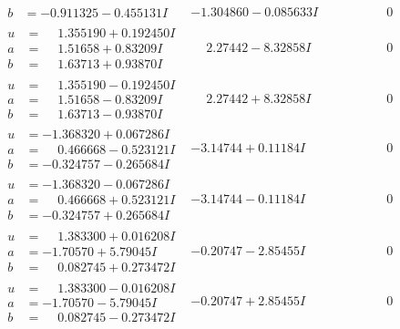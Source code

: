 \documentclass[1p]{elsarticle_modified}
\theoremstyle{definition}
\begin{document}
$$\begin{array}{c|c|c}
\begin{aligned}
b &= -0.911325 - 0.455131 I\end{aligned}
 & -1.304860 - 0.085633 I & \phantom{-0.000000 } 0 \\ \hline\begin{aligned}
u &= \phantom{-}1.355190 + 0.192450 I \\
a &= \phantom{-}1.51658 + 0.83209 I \\
b &= \phantom{-}1.63713 + 0.93870 I\end{aligned}
 & \phantom{-}2.27442 - 8.32858 I & \phantom{-0.000000 } 0 \\ \hline\begin{aligned}
u &= \phantom{-}1.355190 - 0.192450 I \\
a &= \phantom{-}1.51658 - 0.83209 I \\
b &= \phantom{-}1.63713 - 0.93870 I\end{aligned}
 & \phantom{-}2.27442 + 8.32858 I & \phantom{-0.000000 } 0 \\ \hline\begin{aligned}
u &= -1.368320 + 0.067286 I \\
a &= \phantom{-}0.466668 - 0.523121 I \\
b &= -0.324757 - 0.265684 I\end{aligned}
 & -3.14744 + 0.11184 I & \phantom{-0.000000 } 0 \\ \hline\begin{aligned}
u &= -1.368320 - 0.067286 I \\
a &= \phantom{-}0.466668 + 0.523121 I \\
b &= -0.324757 + 0.265684 I\end{aligned}
 & -3.14744 - 0.11184 I & \phantom{-0.000000 } 0 \\ \hline\begin{aligned}
u &= \phantom{-}1.383300 + 0.016208 I \\
a &= -1.70570 + 5.79045 I \\
b &= \phantom{-}0.082745 + 0.273472 I\end{aligned}
 & -0.20747 - 2.85455 I & \phantom{-0.000000 } 0 \\ \hline\begin{aligned}
u &= \phantom{-}1.383300 - 0.016208 I \\
a &= -1.70570 - 5.79045 I \\
b &= \phantom{-}0.082745 - 0.273472 I\end{aligned}
 & -0.20747 + 2.85455 I & \phantom{-0.000000 } 0 \\ \hline\begin{aligned}

\end{aligned}
\end{array}$$
\end{document}
